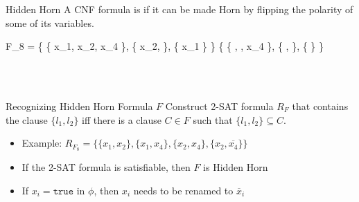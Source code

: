 \documentclass[t]{sdqbeamer}
\begin{document}
\begin{frame}{Hidden Horn }
	A CNF formula is  if it can be made Horn by flipping the polarity of some of its variables.\\[1ex]
	\begin{example}
		\vspace*{-3ex}
		\begin{flalign*}
			\quad F_8 = \{ \{ x_1, x_2, x_4 \}, \{ x_2,  \}, \{ x_1 \} \} 
			\leadsto \{ \{ , , x_4 \}, \{ ,  \}, \{  \} \} 
		\end{flalign*}
	\end{example}~\\
	\\[1ex]
	\pause
	\begin{block}{Recognizing Hidden Horn Formula $F$}
		Construct 2-SAT formula $R_F$ that contains the clause $\{l_1, l_2\}$ iff there is a clause $C \in F$ such that $\{l_1, l_2\} \subseteq C$.\\[1ex]
		\begin{itemize}\setlength{\itemsep}{1em}
			\item Example: $R_{F_8} = \{ \{ x_1, x_2 \}, \{ x_1, x_4 \}, \{ x_2, x_4 \}, \{ x_2, \overline{x_4} \} \}$
			\item If the 2-SAT formula is satisfiable, then $F$ is Hidden Horn
			\item If $x_i = \texttt{true}$ in $\phi$, then $x_i$ needs to be renamed to $\overline x_i$
		\end{itemize}
	\end{block}
\end{frame}
\end{document}
